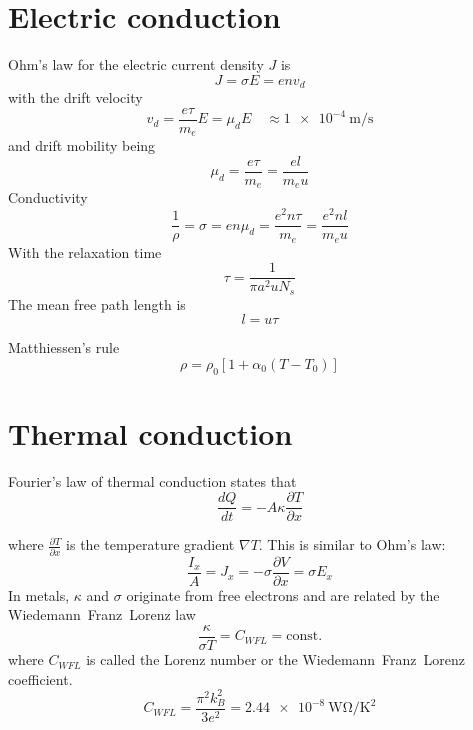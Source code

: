 \section{Electric conduction}

Ohm's law for the electric current density $J$ is
\begin{equation}
    J = \sigma E = e n v_d
\end{equation}
with the drift velocity
\begin{equation}
    v_d = \frac{e \tau}{m_e} E = \mu_d E \quad \approx \SI{1e-4}{\meter\per\second}
\end{equation}
and drift mobility being
\begin{equation}
    \mu_d = \frac{e \tau}{m_e} = \frac{e l}{m_e u}
\end{equation}
Conductivity
\begin{equation}
    \frac{1}{\rho} = \sigma = e n \mu_d = \frac{e^2 n \tau}{m_e} = \frac{e^2 n l}{m_e u}
\end{equation}
With the relaxation time
\begin{equation}
    \tau = \frac{1}{\pi a^2 u N_s}
\end{equation}
The mean free path length is
\begin{equation}
    l = u \tau
\end{equation}

Matthiessen's rule
\begin{equation}
    \rho = \rho_0 \left[ 1 + \alpha_0 \left( T - T_0 \right) \right]
\end{equation}


\section{Thermal conduction}

Fourier's law of thermal conduction states that
\begin{equation}
	\frac{dQ}{dt} = -A \kappa \frac{\partial T}{\partial x}
\end{equation}

where $\frac{\partial T}{\partial x}$ is the temperature gradient $\nabla T$.
This is similar to Ohm's law:
\begin{equation*}
	\frac{I_x}{A} = J_x = - \sigma \frac{\partial V}{\partial x} = \sigma E_x
\end{equation*}
In metals, $\kappa$ and $\sigma$ originate from free electrons and are related by the Wiedemann~Franz~Lorenz law
\begin{equation}
	\frac{\kappa}{\sigma T} = C_{WFL} = \text{const.}
\end{equation}
where $C_{WFL}$ is called the Lorenz number or the Wiedemann~Franz~Lorenz coefficient.
\begin{equation}
	C_{WFL} = \frac{\pi^2 k_B^2}{3 e^2} = \SI{2.44e-8}{\watt\ohm\per\kelvin\squared}
\end{equation}
